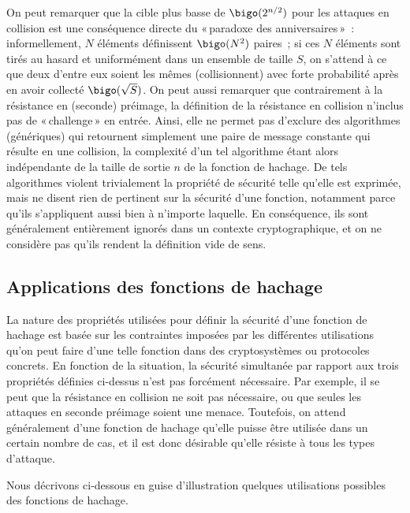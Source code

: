 On peut remarquer que la cible plus basse de 
$\bigo(2^{n/2})$ pour les attaques en collision est une conséquence directe du
«\,paradoxe des anniversaires\,»~: informellement, 
$N$ éléments définissent $\bigo(N^2)$ paires~; si ces $N$ éléments sont tirés au hasard et uniformément dans un ensemble de taille $S$,
on s'attend à ce que deux d'entre eux soient les mêmes (collisionnent) avec forte probabilité après en avoir collecté
$\bigo(\sqrt{S})$. 
On peut aussi remarquer que contrairement à la résistance en (seconde) préimage, la définition de la résistance en collision n'inclus pas de «\,challenge\,» en entrée.
Ainsi, elle ne permet pas d'exclure des algorithmes (génériques) qui retournent simplement une paire de message constante qui résulte en une collision,
la complexité d'un tel algorithme étant alors indépendante de la taille de sortie $n$ de la fonction de hachage.
De tels algorithmes violent trivialement la propriété de sécurité telle qu'elle est exprimée, mais ne disent rien de pertinent sur la sécurité d'une fonction,
notamment parce qu'ils
s'appliquent aussi bien à n'importe laquelle. En conséquence, ils sont généralement entièrement ignorés dans un contexte cryptographique, et
on ne considère pas qu'ils rendent la
définition vide de sens.

\subsection{Applications des fonctions de hachage}

La nature des propriétés utilisées pour définir la sécurité d'une fonction de hachage est basée sur les contraintes imposées par les différentes utilisations qu'on peut faire
d'une telle fonction dans des cryptosystèmes ou protocoles concrets.
En fonction de la situation, la sécurité simultanée par rapport aux trois propriétés définies ci-dessus n'est pas forcément nécessaire. Par exemple, il se peut que la résistance
en collision ne soit pas nécessaire, ou que seules les attaques en seconde préimage soient une menace. Toutefois, on attend généralement d'une fonction de hachage qu'elle puisse être utilisée
dans un certain nombre de cas, et il est donc désirable qu'elle résiste à tous les types d'attaque.

Nous décrivons ci-dessous en guise d'illustration quelques utilisations possibles des fonctions de hachage.

